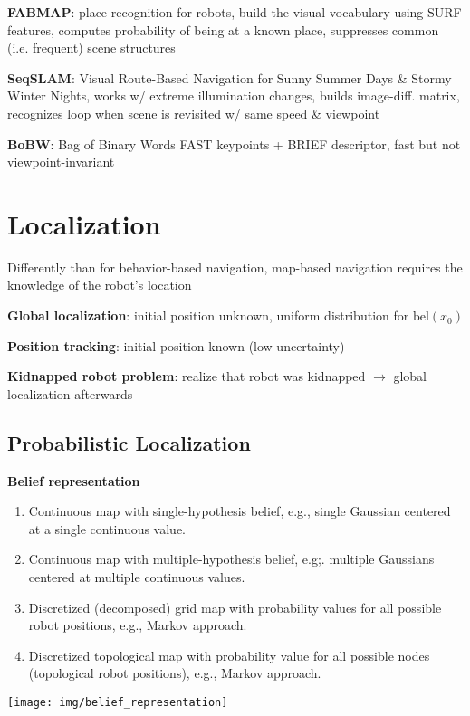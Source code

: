 \documentclass[fontsize=6pt]{scrartcl}
\begin{document}
\begin{multicols*}{4}
\textbf{FABMAP}: place recognition for robots, build the visual vocabulary using SURF features, computes probability of being at a known place, suppresses common (i.e. frequent) scene structures

\textbf{SeqSLAM}: Visual Route-Based Navigation for Sunny Summer Days \& Stormy Winter Nights, works w/ extreme illumination changes, builds image-diff. matrix, recognizes loop when scene is revisited w/ same speed \& viewpoint

\textbf{BoBW}: Bag of Binary Words
FAST keypoints + BRIEF descriptor, fast but not viewpoint-invariant


\section*{Localization}
Differently than for behavior-based navigation, map-based navigation requires the knowledge of the robot’s location

\textbf{Global localization}: initial position unknown, uniform distribution for $\text{bel}(x_0)$

\textbf{Position tracking}: initial position known (low uncertainty)

\textbf{Kidnapped robot problem}: realize that robot was kidnapped $\rightarrow$ global localization afterwards

\subsection*{Probabilistic Localization}
\textbf{Belief representation}

\begin{minipage}{0.62\linewidth}
	\begin{enumerate}[label=\alph*)]
		\item Continuous map with single-hypothesis belief, e.g., single Gaussian centered at a single continuous value.
		\item Continuous map with multiple-hypothesis belief, e.g;. multiple Gaussians centered	at multiple continuous values.
		\item Discretized (decomposed) grid map with probability values	for all possible robot positions, e.g., Markov approach.
		\item Discretized topological map with probability value for all possible nodes (topological robot positions), e.g., Markov approach.
	\end{enumerate}
\end{minipage}
\begin{minipage}{0.38\linewidth}
	\texttt{[image: img/belief\_representation]}
\end{minipage}


\end{multicols*}
\end{document}
